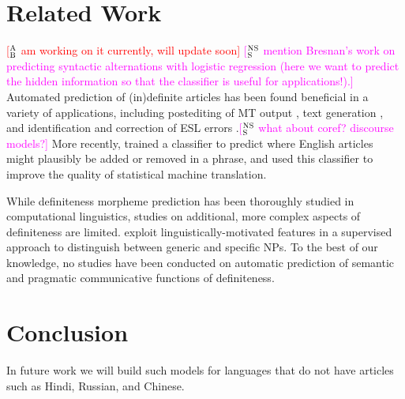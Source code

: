 \documentclass[11pt,letterpaper]{article}
\newcommand{\ensuretext}[1]{#1}
\newcommand{\nssmarker}{\ensuretext{\textcolor{magenta}{\ensuremath{^{\textsc{NS}}_{\textsc{S}}}}}}
\newcommand{\abmarker}{\ensuretext{\textcolor{red}{\ensuremath{^{\textsc{A}}_{\textsc{B}}}}}}
\newcommand{\ytmarker}{\ensuretext{\textcolor{blue}{\ensuremath{^{\textsc{Y}}_{\textsc{T}}}}}}
\newcommand{\arkcomment}[3]{\ensuretext{\textcolor{#3}{[#1 #2]}}}
\newcommand{\nss}[1]{\arkcomment{\nssmarker}{#1}{magenta}}
\newcommand{\ab}[1]{\arkcomment{\abmarker}{#1}{red}}
\newcommand{\yt}[1]{\arkcomment{\ytmarker}{#1}{blue}}
\newcommand{\finalversion}[1]{}
\begin{document}
\section{Related Work}\label{sec:related}
\ab{am working on it currently, will update soon}
\nss{mention Bresnan's work on predicting syntactic alternations with logistic regression 
(here we want to predict the hidden information 
so that the classifier is useful for applications!).}
Automated prediction of (in)definite articles has been found beneficial in a variety of applications, 
including postediting of MT output \citep{knight1994automated}, text generation \citep{DBLP:conf/aaai/Elhadad93,minnen2000memory}, 
and identification and correction of ESL errors  \citep{aehan2006detecting,de2008classifier,gamon2008,rozovskaya2010training}.\nss{what about coref? discourse models?} 
More recently, \citet{tsvetkov13} trained a classifier to predict where English articles might plausibly be added or removed in a phrase, 
and used this classifier to improve the quality of statistical machine translation. 

While definiteness morpheme prediction has been thoroughly studied in computational linguistics, 
studies on additional, more complex aspects of definiteness are limited.  
\citet{reiter10}  exploit linguistically-motivated features in a supervised approach to 
distinguish between generic and specific NPs.\finalversion{\yt{what else?}}
To the best of our knowledge, no studies have been conducted 
on automatic prediction of semantic and pragmatic communicative functions of definiteness.  


\section{Conclusion}\label{sec:conclusion}

In future work we will build such models for languages that do not have articles such as Hindi, Russian, and Chinese.





\setlength{\bibsep}{10pt}
{\fontsize{10}{12.25}\selectfont
}
\end{document}
